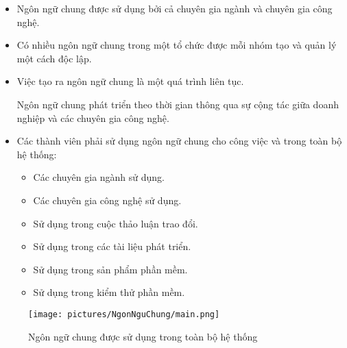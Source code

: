     \begin{itemize}
    
    \item Ngôn ngữ chung được sử dụng bởi cả chuyên gia ngành và chuyên gia công nghệ.
    
    \item Có nhiều ngôn ngữ chung trong một tổ chức được mỗi nhóm tạo và quản lý một cách độc lập.
    
    \item Việc tạo ra ngôn ngữ chung là một quá trình liên tục.
    
    Ngôn ngữ chung phát triển theo thời gian thông qua sự cộng tác giữa doanh nghiệp và các chuyên gia công nghệ.
    
    \item Các thành viên phải sử dụng ngôn ngữ chung cho công việc và trong toàn bộ hệ thống:
    
    \begin{itemize}
    
    \item Các chuyên gia ngành sử dụng.
    
    \item Các chuyên gia công nghệ sử dụng.
    
    \item Sử dụng trong cuộc thảo luận trao đổi.
    
    \item Sử dụng trong các tài liệu phát triển.
    
    \item Sử dụng trong sản phẩm phần mềm.
    
    \item Sử dụng trong kiểm thử phần mềm.
    
    \end{itemize}
    
    \end{itemize}
    
    \begin{figure}[H]
    
    \centering
    
    \texttt{[image: pictures/NgonNguChung/main.png]}
    
    \caption{Ngôn ngữ chung được sử dụng trong toàn bộ hệ thống}
    
    \end{figure}
    
    
    